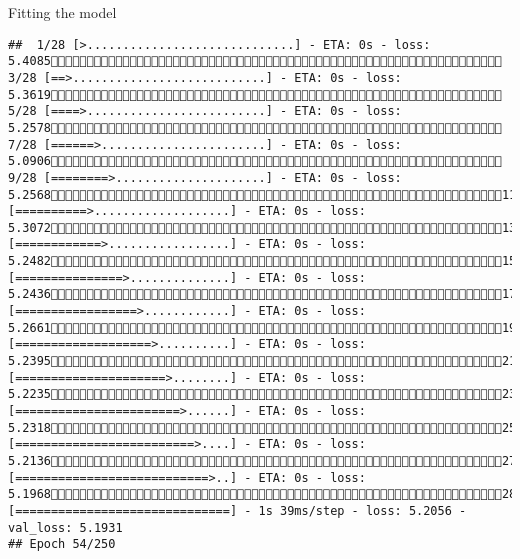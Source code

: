 \documentclass[
  ignorenonframetext,
]{beamer}
\begin{document}
\begin{frame}[fragile]{Fitting the model}
\begin{verbatim}
##  1/28 [>.............................] - ETA: 0s - loss: 5.4085 3/28 [==>...........................] - ETA: 0s - loss: 5.3619 5/28 [====>.........................] - ETA: 0s - loss: 5.2578 7/28 [======>.......................] - ETA: 0s - loss: 5.0906 9/28 [========>.....................] - ETA: 0s - loss: 5.256811/28 [==========>...................] - ETA: 0s - loss: 5.307213/28 [============>.................] - ETA: 0s - loss: 5.248215/28 [===============>..............] - ETA: 0s - loss: 5.243617/28 [=================>............] - ETA: 0s - loss: 5.266119/28 [===================>..........] - ETA: 0s - loss: 5.239521/28 [=====================>........] - ETA: 0s - loss: 5.223523/28 [=======================>......] - ETA: 0s - loss: 5.231825/28 [=========================>....] - ETA: 0s - loss: 5.213627/28 [===========================>..] - ETA: 0s - loss: 5.196828/28 [==============================] - 1s 39ms/step - loss: 5.2056 - val_loss: 5.1931
## Epoch 54/250

\end{verbatim}
\end{frame}
\end{document}
